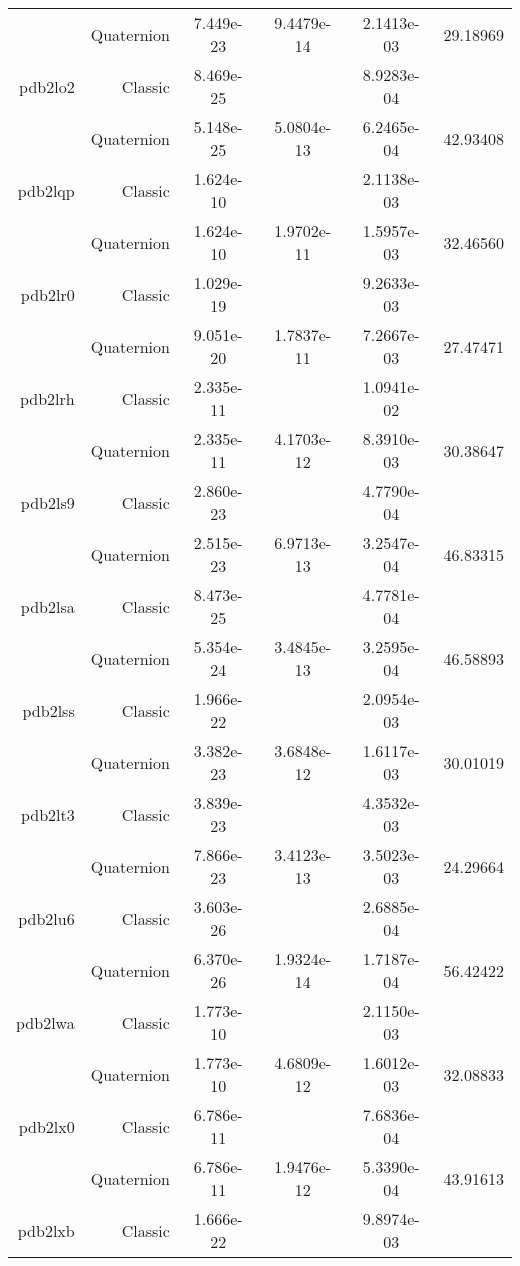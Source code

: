\begin{xltabular}{\textwidth}{r|rS[table-format=1.3e+2]S[table-format=1.4e+2]S[table-format=1.4e+2]S[table-format=-1.5]}
& Quaternion & 7.449e-23 & 9.4479e-14 & 2.1413e-03 & 29.18969\\  \addlinespace
pdb2lo2 & Classic & 8.469e-25 &  & 8.9283e-04 & \\
& Quaternion & 5.148e-25 & 5.0804e-13 & 6.2465e-04 & 42.93408\\  \addlinespace
pdb2lqp & Classic & 1.624e-10 &  & 2.1138e-03 & \\
& Quaternion & 1.624e-10 & 1.9702e-11 & 1.5957e-03 & 32.46560\\  \addlinespace
pdb2lr0 & Classic & 1.029e-19 &  & 9.2633e-03 & \\
& Quaternion & 9.051e-20 & 1.7837e-11 & 7.2667e-03 & 27.47471\\  \addlinespace
pdb2lrh & Classic & 2.335e-11 &  & 1.0941e-02 & \\
& Quaternion & 2.335e-11 & 4.1703e-12 & 8.3910e-03 & 30.38647\\  \addlinespace
pdb2ls9 & Classic & 2.860e-23 &  & 4.7790e-04 & \\
& Quaternion & 2.515e-23 & 6.9713e-13 & 3.2547e-04 & 46.83315\\  \addlinespace
pdb2lsa & Classic & 8.473e-25 &  & 4.7781e-04 & \\
& Quaternion & 5.354e-24 & 3.4845e-13 & 3.2595e-04 & 46.58893\\  \addlinespace
pdb2lss & Classic & 1.966e-22 &  & 2.0954e-03 & \\
& Quaternion & 3.382e-23 & 3.6848e-12 & 1.6117e-03 & 30.01019\\  \addlinespace
pdb2lt3 & Classic & 3.839e-23 &  & 4.3532e-03 & \\
& Quaternion & 7.866e-23 & 3.4123e-13 & 3.5023e-03 & 24.29664\\  \addlinespace
pdb2lu6 & Classic & 3.603e-26 &  & 2.6885e-04 & \\
& Quaternion & 6.370e-26 & 1.9324e-14 & 1.7187e-04 & 56.42422\\  \addlinespace
pdb2lwa & Classic & 1.773e-10 &  & 2.1150e-03 & \\
& Quaternion & 1.773e-10 & 4.6809e-12 & 1.6012e-03 & 32.08833\\  \addlinespace
pdb2lx0 & Classic & 6.786e-11 &  & 7.6836e-04 & \\
& Quaternion & 6.786e-11 & 1.9476e-12 & 5.3390e-04 & 43.91613\\  \addlinespace
pdb2lxb & Classic & 1.666e-22 &  & 9.8974e-03 & \\

\end{xltabular}
